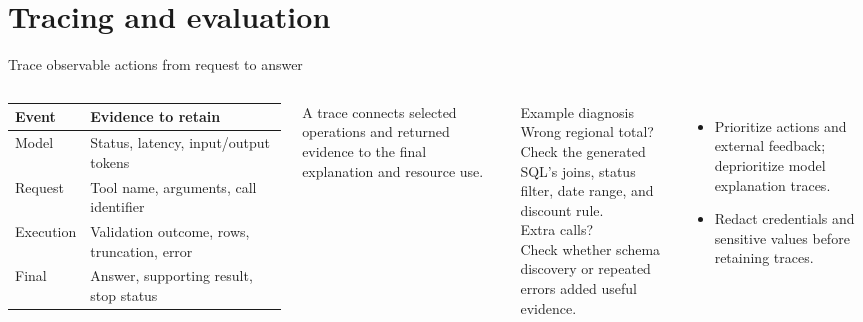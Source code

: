 \documentclass[aspectratio=169]{beamer}
\newcommand{\visualdescription}[1]{\par\vspace{.2em}\noindent\parbox{\linewidth}{\centering\tiny\color{sourcegray}#1}}
\begin{document}
\section{Tracing and evaluation}
\begin{frame}{Trace observable actions from request to answer}
\small
\begin{columns}[c]
\begin{tabularx}{\linewidth}{@{}lY@{}}\toprule
Event & Evidence to retain\\\midrule
Model & Status, latency, input/output tokens\\[.4em]
Request & Tool name, arguments, call identifier\\[.4em]
Execution & Validation outcome, rows, truncation, error\\[.4em]
Final & Answer, supporting result, stop status\\\bottomrule
\end{tabularx}
\visualdescription{A trace connects selected operations and returned evidence to the final explanation and resource use.}
\begin{block}{Example diagnosis}
Wrong regional total?\\
Check the generated SQL's joins, status filter, date range, and discount rule.\\[.5em]
Extra calls?\\
Check whether schema discovery or repeated errors added useful evidence.
\end{block}
\footnotesize
{\setlength{\leftmargini}{1.25em}
\begin{itemize}
\item Prioritize actions and external feedback; deprioritize model explanation traces.
\item Redact credentials and sensitive values before retaining traces.
\end{itemize}
}
\end{columns}
\end{frame}
\end{document}
